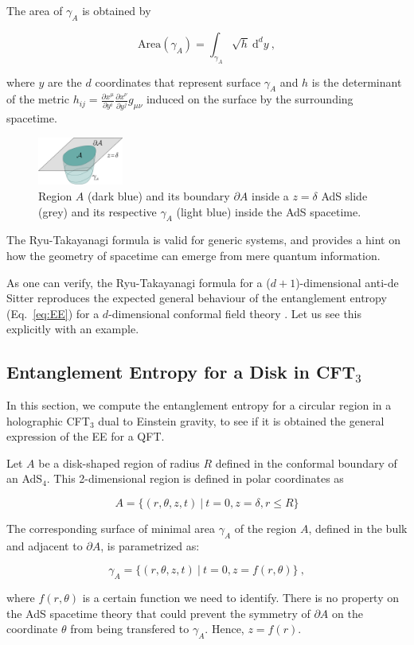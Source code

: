 \documentclass[twocolumn]{revtex4}
\providecommand{\eq}[2]{
    \begin{equation}
        #2
    \label{eq:#1}
    \end{equation}
}
\begin{document}
The area of $\gamma_A$ is obtained by
\eq{EE_RT-area}{
    \text{Area}(\gamma_A) = \int_{\gamma_A} \sqrt{h} \ \mathrm{d}^{d}y \ ,
}
where $y$ are the $d$ coordinates that represent surface $\gamma_A$ and $h$ is the determinant of the metric $h_{ij} = \frac{\partial x^\mu}{\partial y^i} \frac{\partial x^\nu}{\partial y^j} g_{\mu\nu}$ induced on the surface by the surrounding spacetime.

\begin{figure}
    \centering
    \includegraphics[width=0.25\textwidth]{../imatges/EE_AdS-CFT.png}
\caption{Region $A$ (dark blue) and its boundary $\partial A$ inside a $z=\delta$ AdS slide (grey) and its respective $\gamma_A$ (light blue) inside the AdS spacetime.}
\label{fig:EE_AdS-CFT}
\end{figure}

The Ryu-Takayanagi formula is valid for generic systems, and provides a hint on how the geometry of spacetime can emerge from mere quantum information. 

As one can verify, the Ryu-Takayanagi formula for a ($d+1$)-dimensional anti-de Sitter reproduces the expected general behaviour of the entanglement entropy (Eq.~\ref{eq:EE}) for a $d$-dimensional conformal field theory \cite{}. Let us see this explicitly with an example.


\subsection{Entanglement Entropy for a Disk in CFT$_3$} \label{ss:EE-disk}

In this section, we compute the entanglement entropy for a circular region in a holographic CFT$_3$ dual to Einstein gravity, to see if it is obtained the general expression of the EE for a QFT.

Let $A$ be a disk-shaped region of radius $R$ defined in the conformal boundary of an AdS$_4$. This 2-dimensional region is defined in polar coordinates as
\eq{1A}{
    A = \{ ( r, \theta, z, t ) \ | \ t = 0, z = \delta, r \le R \}
}
The corresponding surface of minimal area $\gamma_A$ of the region $A$, defined in the bulk and adjacent to $\partial A$, is parametrized as:
\eq{1gA}{
    \gamma_A = \{ ( r, \theta, z, t ) \ | \ t = 0, z = f (r, \theta) \} \ ,
}
where $f(r,\theta)$ is a certain function we need to identify. There is no property on the AdS spacetime theory that could prevent the symmetry of $\partial A$ on the coordinate $\theta$ from being transfered to $\gamma_A$. Hence, $z=f(r)$.
\end{document}
